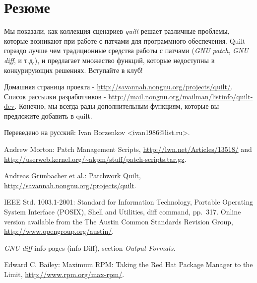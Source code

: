 \documentclass{article}
\newcommand{\prog}[1]{\textit{#1}}
\begin{document}


\section{Резюме}

Мы показали, как коллекция сценариев \textit{quilt} решает различные проблемы, которые возникают при работе с патчами для программного обеспечения. Quilt гораздо лучше чем традиционные средства работы с патчами (\prog{GNU patch}, \prog{GNU diff}, и т.д.), и предлагает множество функций, которые недоступны в конкурирующих решениях. Вступайте в клуб!

Домашняя страница проекта - \url{http://savannah.nongnu.org/projects/quilt/}. Список рассылки разработчиков - \url{http://mail.nongnu.org/mailman/listinfo/quilt-dev}.
Конечно, мы всегда рады дополнительным функциям, которые вы предложите добавить в quilt.

Переведено на русский: Ivan Borzenkov <ivan1986@list.ru>.

\begin{thebibliography}{XX}

Andrew Morton: Patch Management Scripts,
\url{http://lwn.net/Articles/13518/} and
\url{http://userweb.kernel.org/~akpm/stuff/patch-scripts.tar.gz}.

Andreas Grünbacher et al.: Patchwork Quilt,
\url{http://savannah.nongnu.org/projects/quilt}.

IEEE Std. 1003.1-2001: Standard for Information Technology, Portable
Operating System Interface (POSIX), Shell and Utilities, diff
command, pp.~317. Online version available from the The Austin Common
Standards Revision Group, \url{http://www.opengroup.org/austin/}.

\textit{GNU diff} info pages (\textsf{info Diff}), section \textit{Output
Formats.}

Edward C. Bailey: Maximum RPM: Taking the Red Hat Package Manager to the
Limit, \url{http://www.rpm.org/max-rpm/}.

\end{thebibliography}

\end{document}
